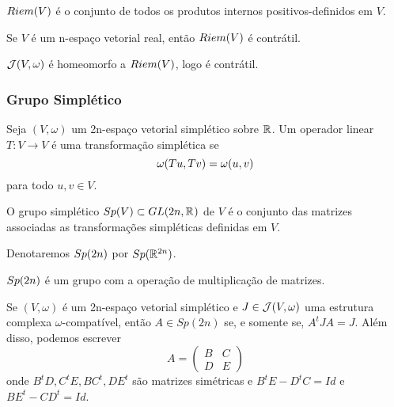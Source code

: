 \documentclass{beamer}
\begin{document}
	\begin{frame}
		
		\begin{definicao}
			$Riem(V)$ é o conjunto de todos os produtos internos positivos-definidos em $V$.
		\end{definicao}
		
		
		\begin{proposicao}
			Se $V$ é um n-espaço vetorial real, então $Riem(V)$ é contrátil.
		\end{proposicao}
		
		\begin{proposicao}
			$\mathcal{J}(V, \omega)$ é homeomorfo a $Riem(V)$, logo é contrátil.
		\end{proposicao}
	\end{frame}
	
	\begin{frame}
		\frametitle{Grupo Simplético}
		
		\begin{definicao}
			Seja $(V, \omega)$ um 2n-espaço vetorial simplético sobre $\mathbb{R}^{}$. Um operador linear $T: V \to V$ é uma transformação simplética se 
			$$
			\omega(Tu, Tv) = \omega(u, v)
			$$ para todo $u,v\in V$.
		\end{definicao}
		
		\begin{definicao}
			O grupo simplético $Sp(V) \subset GL(2n, \mathbb{R}^{})$ de $V$ é o conjunto das matrizes associadas as transformações simpléticas definidas em $V$.
		\end{definicao}	
		
		Denotaremos $Sp(2n)$ por $Sp(\mathbb{R}^{2n})$.
		
	\end{frame}
	
	\begin{frame}
		\begin{proposicao}
			$Sp(2n)$ é um grupo com a operação de multiplicação de matrizes.
		\end{proposicao}
		
		\begin{lema}[Caracterização de $Sp(2n)$]
			 Se $(V, \omega)$ é um 2n-espaço vetorial simplético e $J \in \mathcal{J}(V, \omega)$ uma estrutura complexa $\omega$-compatível, então $A\in Sp(2n)$ se, e somente se, $A^{t}JA = J$. Além disso, podemos escrever 
			$$
			A=
			\left(
			\begin{array}{cc}
			B & C
			\\
			D & E
			\end{array}
			\right)
			$$
			onde $B^{t}D, C^{t}E, BC^{t}, DE^{t} $ são matrizes simétricas e $B^{t}E - D^{t}C = Id$ e $BE^{t} - CD^{t} = Id$.
		\end{lema}
	\end{frame}
	
\end{document}
